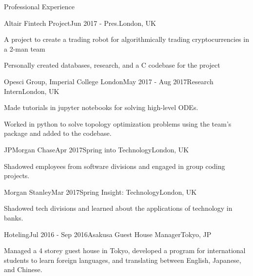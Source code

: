 \documentclass[10pt]{resume} %
\begin{document}
\begin{rSection}{Professional Experience}

\begin{rSubsection}{Altair Fintech Project}{Jun 2017 - Pres.}{}{London, UK}
    \item A project to create a trading robot for algorithmically trading cryptocurrencies in a 2-man team
    \item Personally created databases, research, and a C codebase for the project
\end{rSubsection}


\begin{rSubsection}{Opesci Group, Imperial College London}{May 2017 - Aug 2017}{Research Intern}{London, UK}
    \item Made tutorials in jupyter notebooks for solving high-level ODEs.
    \item Worked in python to solve topology optimization problems using the team's package and added to the codebase.
\end{rSubsection}


\begin{rSubsection}{JPMorgan Chase}{Apr 2017}{Spring into Technology}{London, UK}
    \item Shadowed employees from software divisions and engaged in group coding projects.
\end{rSubsection}


\begin{rSubsection}{Morgan Stanley}{Mar 2017}{Spring Insight: Technology}{London, UK}
    \item Shadowed tech divisions and learned about the applications of technology in banks.
\end{rSubsection}


\begin{rSubsection}{Hoteling}{Jul 2016 - Sep 2016}{Asakusa Guest House Manager}{Tokyo, JP}
    \item Managed a 4 storey guest house in Tokyo, developed a program for international students to learn foreign languages, and translating between English, Japanese, and Chinese.
\end{rSubsection}


\end{rSection}
\end{document}
